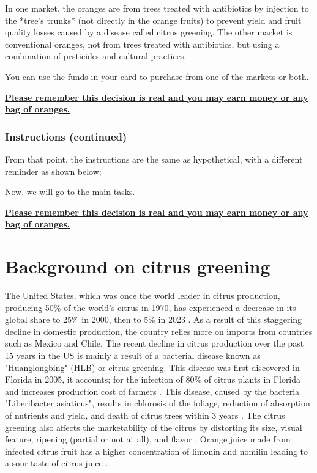 \documentclass[12pt]{article}
\begin{document}
{In one market, the oranges are from trees treated with antibiotics by injection to the *tree’s trunks* (not directly in the orange fruits) to prevent yield and fruit quality losses caused by a disease called citrus greening. The other market is conventional oranges, not from trees treated with antibiotics, but using a combination of pesticides and cultural practices.

You can use the funds in your card to purchase from one of the markets or both.

\textbf{ \underline{Please remember this decision is real and you may earn money or any bag of oranges.}}

\clearpage

\subsubsection*{Instructions (continued)}

 From that point, the instructions are the same as hypothetical, with a different reminder as shown below;

 Now, we will go to the main tasks.


\textbf{ \underline{Please remember this decision is real and you may earn money or any bag of oranges.}}

 \clearpage

\section{Background on citrus greening}

 The United States, which was once the world leader in citrus production, producing 50\% of the world's citrus in 1970, has experienced a decrease in its global share to 25\% in 2000, then to 5\% in 2023 \citep{munch_us_2023} . As a result of this staggering decline in domestic production, the country relies more on imports from countries such as Mexico and Chile. The recent decline in citrus production over the past 15 years in the US is mainly a result of a bacterial disease known as "Huanglongbing" (HLB) or citrus greening. This disease was first discovered in Florida in 2005, it accounts; for the infection of 80\% of citrus plants in Florida \citep{li2020citrus} and increases  production cost of farmers \citep{roka2009citrus} . This disease, caused by the bacteria "Liberibacter asiaticus", results in chlorosis of the foliage, reduction of absorption of nutrients and yield, and death of citrus trees within 3 years \citep{bove_huanglongbing_2006}. The citrus greening also affects the marketability of the citrus by distorting its size, visual feature, ripening (partial or not at all), and flavor \citep{farnsworth_potential_2024}. Orange juice made from infected citrus fruit has a higher concentration of limonin and nomilin leading to a sour taste of citrus juice \citep{paula2018active}. 

}
\end{document}
